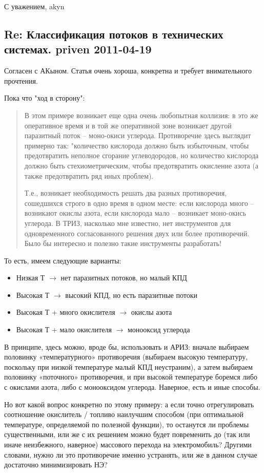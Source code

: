 \documentclass[a4paper,11pt]{article}
\begin{document}
С уважением, akyn


\subsection*{Re: Классификация потоков в технических системах. priven 2011-04-19}

Согласен с АКыном. Статья очень хороша, конкретна и требует внимательного
прочтения.

Пока что "ход в сторону":
\begin{quote}
  В этом примере возникает еще одна очень любопытная коллизия: в это же
  оперативное время и в той же оперативной зоне возникает другой паразитный
  поток -- моно-окиси углерода. Противоречие здесь выглядит примерно так:
  "количество кислорода должно быть избыточным, чтобы предотвратить неполное
  сгорание углеводородов, но количество кислорода должно быть
  стехиометрическим, чтобы предотвратить окисление азота (а также
  предотвратить ряд иных проблем).

  Т.е., возникает необходимость решать два разных противоречия, сошедшихся
  строго в одно время в одном месте: если кислорода много -- возникают окислы
  азота, если кислорода мало -- возникает моно-окись углерода. В ТРИЗ,
  насколько мне известно, нет инструментов для одновременного согласованного
  решения двух или более противоречий. Было бы интересно и полезно такие
  инструменты разработать!
\end{quote}

То есть, имеем следующие варианты:
\begin{itemize}
\item Низкая Т $\to$ нет паразитных потоков, но малый КПД
\item Высокая Т $\to$ высокий КПД, но есть паразитные потоки
\item Высокая Т + много окислителя $\to$ окислы азота
\item Высокая Т + мало окислителя $\to$ монооксид углерода
\end{itemize}
В принципе, здесь можно, вроде бы, использовать и АРИЗ: вначале выбираем
половинку «температурного» противоречия (выбираем высокую температуру,
поскольку при низкой температуре малый КПД неустраним), а затем выбираем
половинку «поточного» противоречия, и при высокой температуре боремся либо с
окислами азота, либо с монооксидом углерода. Наверное, есть и иные способы.

Но вот какой вопрос конкретно по этому примеру: а если точно отрегулировать
соотношение окислитель / топливо наилучшим способом (при оптимальной
температуре, определяемой по полезной функции), то останутся ли проблемы
существенными, или же с их решением можно будет повременить до (так или иначе
неизбежного, наверное) массового перехода на электромобиль? Другими словами,
нужно ли это противоречие именно устранять, или же в данном случае достаточно
минимизировать НЭ?
\end{document}
